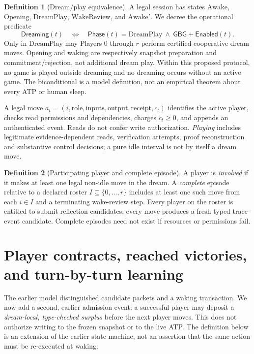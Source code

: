 \documentclass[11pt,letterpaper]{article}
\theoremstyle{definition}
\newtheorem{definition}{Definition}[section]
\theoremstyle{plain}
\theoremstyle{definition}
\newcommand{\s}{\mathsf}
\begin{document}
\begin{definition}[Dream/play equivalence]
A legal session has states $\mathrm{Awake}$, $\mathrm{Opening}$, $\mathrm{DreamPlay}$, $\mathrm{WakeReview}$, and $\mathrm{Awake}'$. We decree the operational predicate
\[
 \s{Dreaming}(t)\quad\Longleftrightarrow\quad
 \s{Phase}(t)=\mathrm{DreamPlay}\ \land\ \s{GBG+Enabled}(t).
 \tag{D/P}
\]
Only in $\mathrm{DreamPlay}$ may Players 0 through $r$ perform certified cooperative dream moves. Opening and waking are respectively snapshot preparation and commitment/rejection, not additional dream play. Within this proposed protocol, no game is played outside dreaming and no dreaming occurs without an active game. The biconditional is a model definition, not an empirical theorem about every ATP or human sleep.
\end{definition}

A legal move $a_t=(i,\mathrm{role},\mathrm{inputs},\mathrm{output},\mathrm{receipt},c_t)$ identifies the active player, checks read permissions and dependencies, charges $c_t\geq0$, and appends an authenticated event. Reads do not confer write authorization. \emph{Playing} includes legitimate evidence-dependent reads, verification attempts, proof reconstruction and substantive control decisions; a pure idle interval is not by itself a dream move.

\begin{definition}[Participating player and complete episode]
A player is \emph{involved} if it makes at least one legal non-idle move in the dream. A \emph{complete} episode relative to a declared roster $I\subseteq\{0,\ldots,r\}$ includes at least one such move from each $i\in I$ and a terminating wake-review step. Every player on the roster is entitled to submit reflection candidates; every move produces a fresh typed trace-event candidate. Complete episodes need not exist if resources or permissions fail.
\end{definition}


\section{Player contracts, reached victories, and turn-by-turn learning}\label{gl-first-W0-s3}
\label{sec:victory-learning}
The earlier model distinguished candidate packets and a waking transaction. We now add a second, earlier admission event: a successful player may deposit a \emph{dream-local, type-checked surplus} before the next player moves. This does not authorize writing to the frozen snapshot or to the live ATP. The definition below is an extension of the earlier state machine, not an assertion that the same action must be re-executed at waking.
\end{document}
